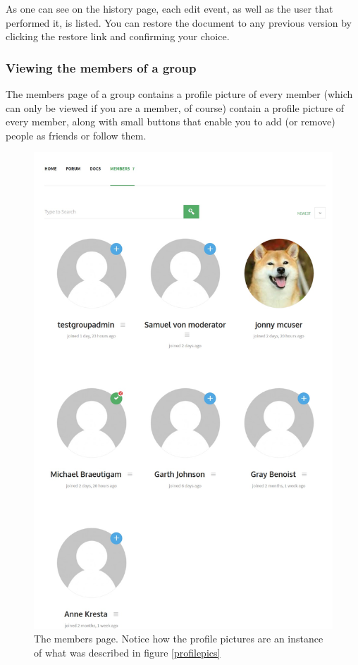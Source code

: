 \documentclass[10pt]{article}
\begin{document}
\begin{flushleft}
As one can see on the history page, each edit event, as well as the user that performed it, is listed.  You can restore the document to any previous version by clicking the restore link and confirming your choice. 
\end{flushleft}

\subsubsection{Viewing the members of a group}

\begin{flushleft}
The members page of a group contains a profile picture of every member (which can only be viewed if you are a member, of course) contain a profile picture of every member, along with small buttons that enable you to add (or remove) people as friends or follow them. 
\end{flushleft}


\begin{figure}[H]
    \centering
    \includegraphics[scale=0.25]{images/groupmembers.jpg}
    \caption{The members page.  Notice how the profile pictures are an instance of what was described in figure \ref{profilepics}}
    \label{fig:my_label}
\end{figure}
\end{document}
